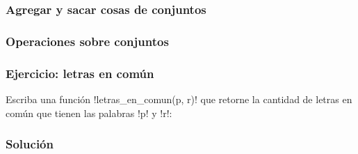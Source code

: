 \documentclass[12pt]{beamer}
\begin{document}
  \begin{frame}
    \frametitle{Agregar y sacar cosas de conjuntos}
    \label{conjuntos-modificar}
    
  \end{frame}

  \begin{frame}
    \frametitle{Operaciones sobre conjuntos}
    \label{conjuntos-operaciones}
    
  \end{frame}

  \begin{frame}
    \frametitle{Ejercicio: letras en común}
    \label{ejercicio-letras-comun}
    Escriba una función \li!letras_en_comun(p, r)!
    que retorne la cantidad de letras en común
    que tienen las palabras \li!p! y \li!r!:
    
  \end{frame}

  \begin{frame}
    \frametitle{Solución}
    \label{solucion-letras-comun}
    
  \end{frame}
\end{document}
